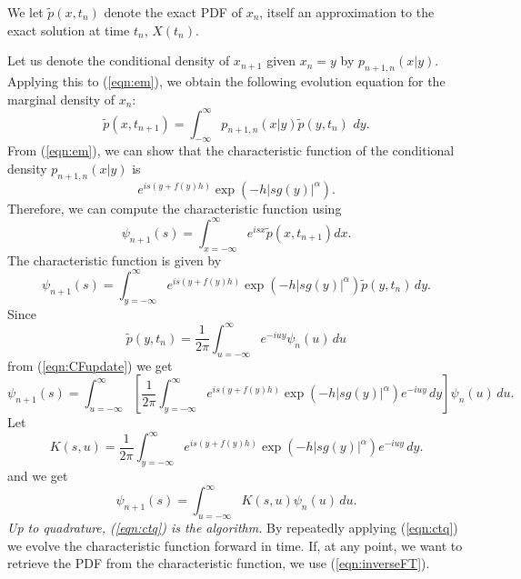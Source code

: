 \documentclass[11pt,letterpaper]{article}
\begin{document}
We let $\widetilde{p}(x,t_n)$ denote the exact PDF of $x_n$, itself an approximation to the exact solution at time $t_n$, $X(t_n)$.

Let us denote the conditional density of $x_{n+1}$ given $x_n = y$ by $p_{n+1, n}(x | y)$.  Applying this to (\ref{eqn:em}), we obtain the following evolution equation for the marginal density of $x_n$:
\begin{equation}
\label{dtq}
\widetilde{p}(x, t_{n+1})=\int_{-\infty}^\infty p_{n+1, n}(x | y ) \widetilde{p}(y, t_n) \, \, dy.
\end{equation}
\noindent
From (\ref{eqn:em}), we can show that the characteristic function of the conditional density $p_{n+1, n}(x | y )$  is
\[
e^{is \left(y+ f(y)h \right)}\exp (- h |s g(y)|^{\alpha} ).
\]
Therefore, we can compute the characteristic function using
\begin{equation}
\label{eqn:CFdefn}
\psi_{n+1}(s) = \int_{x=-\infty}^{\infty}e^{isx}\widetilde{p}(x,t_{n+1})dx.
\end{equation}
The characteristic function is given by
\begin{equation}
\label{eqn:CFupdate}
\psi_{n+1}(s) = \int_{y=-\infty}^{\infty}e^{is\left(y+f(y)h\right)}\exp{\left(  -h |s g(y)|^{\alpha} \right)}\widetilde{p}(y, t_n) \, dy.
\end{equation}
Since
\begin{equation}
\label{eqn:inverseFT}
\widetilde{p}(y, t_n) = \frac{1}{2\pi}\int_{u=-\infty}^{\infty}e^{-iuy}\psi_{n}(u)\, du
\end{equation}
from (\ref{eqn:CFupdate}) we get
\begin{equation}
\psi_{n+1}(s) =  \int_{u=-\infty}^{\infty}\left[\frac{1}{2\pi}\int_{y=-\infty}^{\infty}e^{is\left(y+f(y)h\right)}\exp{\left(  -h |s g(y)|^{\alpha} \right)}e^{-iuy}\, dy \right]\psi_{n}(u) \, du.\nonumber
\end{equation}
Let
\[
K(s,u) = \frac{1}{2\pi}\int_{y=-\infty}^{\infty}e^{is\left(y+f(y)h\right)}\exp{\left(  -h |s g(y)|^{\alpha} \right)}e^{-iuy}\, dy.
\]
and we get
\begin{equation}
\label{eqn:ctq}
\psi_{n+1}(s) =  \int_{u=-\infty}^{\infty}K(s,u)\psi_{n}(u) \, du.
\end{equation}
\emph{Up to quadrature, (\ref{eqn:ctq}) is the algorithm.} By repeatedly applying (\ref{eqn:ctq}) we evolve the characteristic function forward in time.  If, at any point, we want to retrieve the PDF from the characteristic function, we use (\ref{eqn:inverseFT}).
\end{document}
